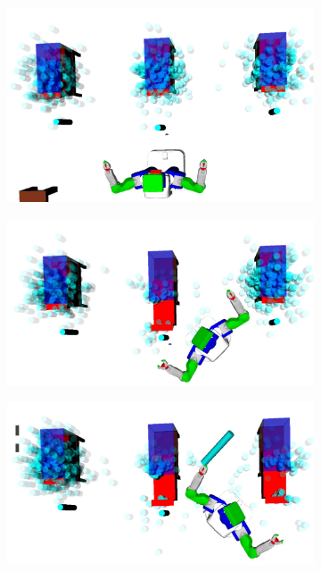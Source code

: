 \begin{figure}
  \centering
  \begin{subfigure}[b]{0.48\linewidth}
    \includegraphics[width=\textwidth]{drawer_images/drawer_dist_0.png}
    \caption{}
    \label{fig:step1}
  \end{subfigure}
  \begin{subfigure}[b]{0.48\linewidth}
    \includegraphics[width=\textwidth]{drawer_images/drawer_dist_1.png}
    \caption{}
    \label{fig:step2}
  \end{subfigure}
  \begin{subfigure}[b]{0.48\linewidth}
    \includegraphics[width=\textwidth]{drawer_images/drawer_dist_2.png}

\end{subfigure}
\end{figure}
